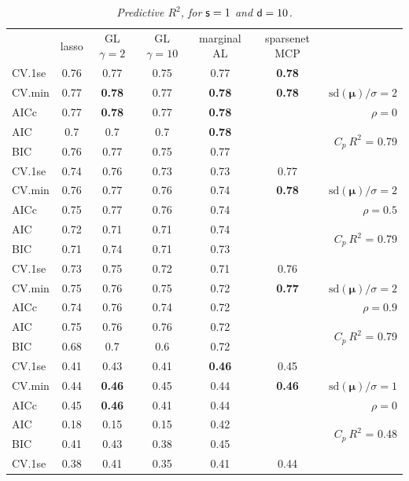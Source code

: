 \documentclass[12pt]{article}
\newcommand{\mr}[1]{\mathrm{#1}}
\newcommand{\bm}[1]{\mathbf{#1}}
\begin{document}
\begin{table}[p]\vspace{-.5cm}
\caption[l]{\it Predictive $R^2$, for ${\sf s}=1$ and  ${\sf d}=10$.}
\vspace{-.5cm}
\small{}
\begin{center}
\begin{tabular}{l*{5}{c}|r}
 & lasso & GL $\gamma=2$ & GL $\gamma=10$ & marginal AL & sparsenet MCP  &  \\
\cline{1-7}
CV.1se & 0.76 & 0.77 & 0.75 & 0.77 & {\bf 0.78} &\\
CV.min & 0.77 & {\bf 0.78} & 0.77 & {\bf 0.78} & {\bf 0.78} &  $\mr{sd}(\bm{\mu})/\sigma=2$ \\
AICc & 0.77 & {\bf 0.78} & 0.77 & {\bf 0.78} & & $\rho=0$ \\
AIC & 0.7 & 0.7 & 0.7 & {\bf 0.78} & & \multirow{2}{*}{$C_p ~ R^2$ = 0.79} \\
BIC & 0.76 & 0.77 & 0.75 & 0.77 & & \\
 \hline 
CV.1se & 0.74 & 0.76 & 0.73 & 0.73 & 0.77 &\\
CV.min & 0.76 & 0.77 & 0.76 & 0.74 & {\bf 0.78} &  $\mr{sd}(\bm{\mu})/\sigma=2$ \\
AICc & 0.75 & 0.77 & 0.76 & 0.74 & & $\rho=0.5$ \\
AIC & 0.72 & 0.71 & 0.71 & 0.74 & & \multirow{2}{*}{$C_p ~ R^2$ = 0.79} \\
BIC & 0.71 & 0.74 & 0.71 & 0.73 & & \\
 \hline 
CV.1se & 0.73 & 0.75 & 0.72 & 0.71 & 0.76 &\\
CV.min & 0.75 & 0.76 & 0.75 & 0.72 & {\bf 0.77} &  $\mr{sd}(\bm{\mu})/\sigma=2$ \\
AICc & 0.74 & 0.76 & 0.74 & 0.72 & & $\rho=0.9$ \\
AIC & 0.75 & 0.76 & 0.76 & 0.72 & & \multirow{2}{*}{$C_p ~ R^2$ = 0.79} \\
BIC & 0.68 & 0.7 & 0.6 & 0.72 & & \\
 \hline 
CV.1se & 0.41 & 0.43 & 0.41 & {\bf 0.46} & 0.45 &\\
CV.min & 0.44 & {\bf 0.46} & 0.45 & 0.44 & {\bf 0.46} &  $\mr{sd}(\bm{\mu})/\sigma=1$ \\
AICc & 0.45 & {\bf 0.46} & 0.41 & 0.44 & & $\rho=0$ \\
AIC & 0.18 & 0.15 & 0.15 & 0.42 & & \multirow{2}{*}{$C_p ~ R^2$ = 0.48} \\
BIC & 0.41 & 0.43 & 0.38 & 0.45 & & \\
 \hline 
CV.1se & 0.38 & 0.41 & 0.35 & 0.41 & 0.44 &\\

\end{tabular}
\end{center}
\end{table}
\end{document}
